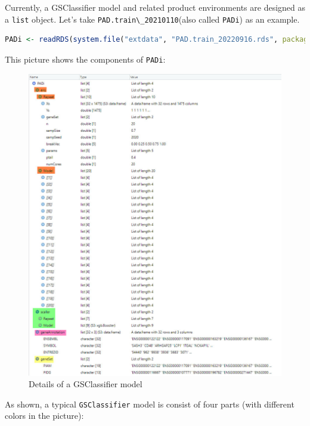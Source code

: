\documentclass[
  12pt,
]{book}
\newcommand{\passthrough}[1]{#1}
\begin{document}
Currently, a GSClassifier model and related product environments are designed as a \passthrough{\lstinline!list!} object. Let's take \passthrough{\lstinline!PAD.train\_20210110!}(also called \passthrough{\lstinline!PADi!}) as an example.

\begin{lstlisting}[language=R]
PADi <- readRDS(system.file("extdata", "PAD.train_20220916.rds", package = "GSClassifier")) 
\end{lstlisting}

This picture shows the components of \passthrough{\lstinline!PADi!}:

\begin{figure}

{\centering \includegraphics[width=0.9\linewidth]{./fig/GSClassifier-model} 

}

\caption{Details of a GSClassifier model}\label{fig:GSClassifierModel}
\end{figure}

As shown, a typical \passthrough{\lstinline!GSClassifier!} model is consist of four parts (with different colors in the picture):
\end{document}
